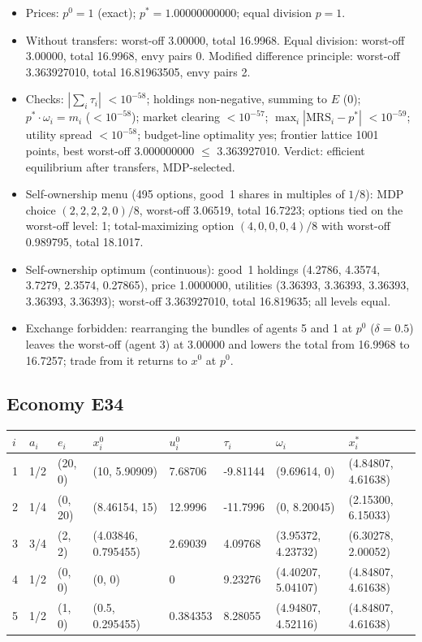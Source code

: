 \begin{itemize}[leftmargin=1.2em,itemsep=0pt,topsep=2pt]\footnotesize
\item Prices: $p^0 = 1$ (exact); $p^* = 1.00000000000$; equal division $p = 1$.
\item Without transfers: worst-off 3.00000, total 16.9968. Equal division: worst-off 3.00000, total 16.9968, envy pairs 0. Modified difference principle: worst-off 3.363927010, total 16.81963505, envy pairs 2.
\item Checks: $|\sum_i\tau_i|$ $<10^{-58}$; holdings non-negative, summing to $E$ (0); $p^*\cdot\omega_i = m_i$ ($<10^{-58}$); market clearing $<10^{-57}$; $\max_i|\mathrm{MRS}_i - p^*|$ $<10^{-59}$; utility spread $<10^{-58}$; budget-line optimality yes; frontier lattice 1001 points, best worst-off 3.000000000 $\leq$ 3.363927010. Verdict: efficient equilibrium after transfers, MDP-selected.
\item Self-ownership menu (495 options, good~1 shares in multiples of $1/8$): MDP choice $(2, 2, 2, 2, 0)/8$, worst-off 3.06519, total 16.7223; options tied on the worst-off level: 1; total-maximizing option $(4, 0, 0, 0, 4)/8$ with worst-off 0.989795, total 18.1017.
\item Self-ownership optimum (continuous): good~1 holdings (4.2786, 4.3574, 3.7279, 2.3574, 0.27865), price 1.0000000, utilities (3.36393, 3.36393, 3.36393, 3.36393, 3.36393); worst-off 3.363927010, total 16.819635; all levels equal.
\item Exchange forbidden: rearranging the bundles of agents 5 and 1 at $p^0$ ($\delta = 0.5$) leaves the worst-off (agent 3) at 3.00000 and lowers the total from 16.9968 to 16.7257; trade from it returns to $x^0$ at $p^0$.
\end{itemize}

\subsection*{Economy E34}
\label{ec:E34}
{\scriptsize\setlength{\tabcolsep}{3pt}
\begin{tabular}{@{}llllllll@{}}
\toprule
$i$ & $a_i$ & $e_i$ & $x^0_i$ & $u^0_i$ & $\tau_i$ & $\omega_i$ & $x^*_i$ \\
\midrule
1 & 1/2 & (20, 0) & (10, 5.90909) & 7.68706 & -9.81144 & (9.69614, 0) & (4.84807, 4.61638) \\
2 & 1/4 & (0, 20) & (8.46154, 15) & 12.9996 & -11.7996 & (0, 8.20045) & (2.15300, 6.15033) \\
3 & 3/4 & (2, 2) & (4.03846, 0.795455) & 2.69039 & 4.09768 & (3.95372, 4.23732) & (6.30278, 2.00052) \\
4 & 1/2 & (0, 0) & (0, 0) & 0 & 9.23276 & (4.40207, 5.04107) & (4.84807, 4.61638) \\
5 & 1/2 & (1, 0) & (0.5, 0.295455) & 0.384353 & 8.28055 & (4.94807, 4.52116) & (4.84807, 4.61638) \\
\bottomrule\end{tabular}}


